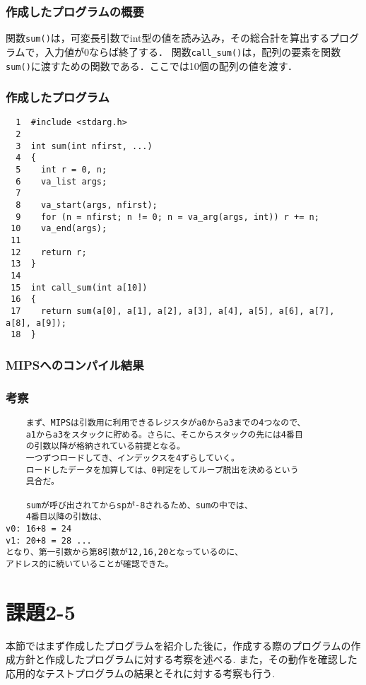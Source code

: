 \documentclass[a4j,11pt]{jarticle}
\begin{document}
  \subsubsection{作成したプログラムの概要}
  関数\verb|sum()|は，可変長引数でint型の値を読み込み，その総合計を算出するプログラムで，入力値が0ならば終了する．
  関数\verb|call_sum()|は，配列の要素を関数\verb|sum()|に渡すための関数である．ここでは10個の配列の値を渡す．
  \subsubsection{作成したプログラム}
  \begin{verbatim}
  1  #include <stdarg.h>
  2
  3  int sum(int nfirst, ...)
  4  {
  5    int r = 0, n;
  6    va_list args;
  7
  8    va_start(args, nfirst);
  9    for (n = nfirst; n != 0; n = va_arg(args, int)) r += n;
 10    va_end(args);
 11
 12    return r;
 13  }
 14
 15  int call_sum(int a[10])
 16  {
 17    return sum(a[0], a[1], a[2], a[3], a[4], a[5], a[6], a[7], a[8], a[9]);
 18  }
  \end{verbatim}
  \subsubsection{MIPSへのコンパイル結果}
  \subsubsection{考察}
  \begin{verbatim}
    まず、MIPSは引数用に利用できるレジスタがa0からa3までの4つなので、
    a1からa3をスタックに貯める。さらに、そこからスタックの先には4番目
    の引数以降が格納されている前提となる。 
    一つずつロードしてき、インデックスを4ずらしていく。
    ロードしたデータを加算しては、0判定をしてループ脱出を決めるという
    具合だ。

    sumが呼び出されてからspが-8されるため、sumの中では、
    4番目以降の引数は、
v0: 16+8 = 24
v1: 20+8 = 28 ...
となり、第一引数から第8引数が12,16,20となっているのに、
アドレス的に続いていることが確認できた。
  \end{verbatim}

 \section{課題2-5}
本節ではまず作成したプログラムを紹介した後に，作成する際のプログラムの作成方針と作成したプログラムに対する考察を述べる.
また，その動作を確認した応用的なテストプログラムの結果とそれに対する考察も行う.
\end{document}
